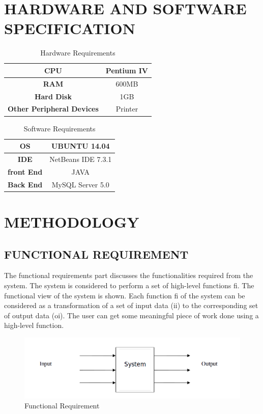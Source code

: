 \section{HARDWARE AND SOFTWARE SPECIFICATION}

\begin{table}[H]
\centering
\caption{Hardware Requirements}
\label{Hardware Requirements}
\begin{tabular}{|c|c|}
\hline
\textbf{CPU}                      & Pentium IV \\ \hline
\textbf{RAM}                      & 600MB      \\ \hline
\textbf{Hard Disk}                & 1GB        \\ \hline
\textbf{Other Peripheral Devices} & Printer    \\ \hline
\end{tabular}
\end{table}



\begin{table}[H]
\centering
\caption{Software Requirements}
\label{Software Requirements}
\begin{tabular}{|c|c|}
\hline
\textbf{OS}                      & UBUNTU 14.04 \\ \hline
\textbf{IDE}                      & NetBeans IDE 7.3.1      \\ \hline
\textbf{front End}                & JAVA        \\ \hline
\textbf{Back End} & MySQL Server 5.0    \\ \hline
\end{tabular}
\end{table}

\section{METHODOLOGY}
\subsection{FUNCTIONAL REQUIREMENT}

The functional requirements part discusses the functionalities required from the system. The system is considered to perform a set of high-level functions {fi}. The functional view of the system is shown. Each function fi of the system can be considered as a transformation of a set of input data (ii) to the corresponding set of output data (oi). The user can get some meaningful piece of work done using a high-level function.


\begin{figure}[ht]
\begin{center}
\includegraphics[scale=0.5]{images/LATEXREP001.png}
\end{center}
\caption{Functional Requirement}
\label{Functional Requirement}
\end{figure}






